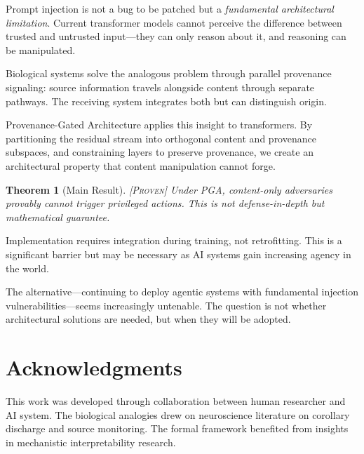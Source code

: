 \documentclass[11pt,a4paper]{article}
\theoremstyle{plain}
\newtheorem{theorem}{Theorem}[section]
\theoremstyle{definition}
\theoremstyle{remark}
\newcommand{\proven}{\textsc{[Proven]}}
\begin{document}
Prompt injection is not a bug to be patched but a \emph{fundamental architectural limitation}. Current transformer models cannot perceive the difference between trusted and untrusted input---they can only reason about it, and reasoning can be manipulated.

Biological systems solve the analogous problem through parallel provenance signaling: source information travels alongside content through separate pathways. The receiving system integrates both but can distinguish origin.

Provenance-Gated Architecture applies this insight to transformers. By partitioning the residual stream into orthogonal content and provenance subspaces, and constraining layers to preserve provenance, we create an architectural property that content manipulation cannot forge.

\begin{theorem}[Main Result] \proven
Under PGA, content-only adversaries provably cannot trigger privileged actions. This is not defense-in-depth but mathematical guarantee.
\end{theorem}

Implementation requires integration during training, not retrofitting. This is a significant barrier but may be necessary as AI systems gain increasing agency in the world.

The alternative---continuing to deploy agentic systems with fundamental injection vulnerabilities---seems increasingly untenable. The question is not whether architectural solutions are needed, but when they will be adopted.

\section*{Acknowledgments}

This work was developed through collaboration between human researcher and AI system. The biological analogies drew on neuroscience literature on corollary discharge and source monitoring. The formal framework benefited from insights in mechanistic interpretability research.
\end{document}
